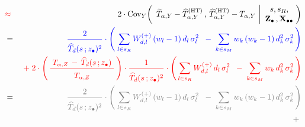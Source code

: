 \begin{itemize}
\begin{eqnarray*}
    & {\color{red}\approx} &
        2
        \cdot
        \Cov_{Y}\!\left(\;\,
            \widetilde{T}_{\alpha,Y} - \widehat{T}^{\textnormal{(HT)}}_{\alpha,Y}
            \,,\,
            \widehat{T}^{\textnormal{(HT)}}_{\alpha,Y} - T_{\alpha,Y}
            \,\left\vert
            \begin{array}{c}
                s,s_{R},
                \\
                \Zdot\,,\Xobs
                \end{array}
            \right.
            \!\!\right)
    \\
    & = &
        {\color{blue}
        \dfrac{
            2
            }{
            \overset{{\color{white}.}}{
                \widehat{T}_{d}(s\,;\zdot)^{2}
                }
            }
        \cdot
        \left(\;
            \underset{l \in s_{R}}{\sum}\,
            W^{(+)}_{d,l}\,(w_{l}-1)\,d_{l}\,\sigma_{l}^{2}
            \;\;-\;
            \underset{k \in s_{M}}{\sum}\,
            w_{k}\,(w_{k}-1)\,d_{k}^{2}\,\sigma_{k}^{2}
            \,\right)
        }
    \\
    &&
        {\color{red}
        \; + \;
        2
        \cdot
        \left(\,
            \dfrac{
                {\color{white}.}
                T_{\alpha,Z} \,-\, \widehat{T}_{d}(s\,;\zdot)
                {\color{white}.}
                }{
                \overset{{\color{white}.}}{
                    T_{\alpha,Z}
                    }
                }           
            \,\right)
        \cdot
        \dfrac{
            1
            }{
            \overset{{\color{white}.}}{
                \widehat{T}_{d}(s\,;\zdot)^{2}
                }
            }
        \cdot
        \left(\,
            \underset{l \in s_{R}}{\sum}\,
            W^{(+)}_{d,l}\,d_{l}\,\sigma_{l}^{2}
            \;\;-\;
            \underset{k \in s_{M}}{\sum}\,
            w_{k}\,d_{k}^{2}\,\sigma_{k}^{2}
            \,\right)
        }
    \\
    & = &
        {\color{gray}
        \dfrac{
            2
            }{
            \overset{{\color{white}.}}{
                \widehat{T}_{d}(s\,;\zdot)^{2}
                }
            }
        \cdot
        \left(\;
            \underset{l \in s_{R}}{\sum}\,
            W^{(+)}_{d,l}\,(w_{l}-1)\,d_{l}\,\sigma_{l}^{2}
            \;\;-\;
            \underset{k \in s_{M}}{\sum}\,
            w_{k}\,(w_{k}-1)\,d_{k}^{2}\,\sigma_{k}^{2}
            \,\right)
        }
    \\
    &&
        {\color{gray}
        \; + \;
}
\end{eqnarray*}
\end{itemize}
